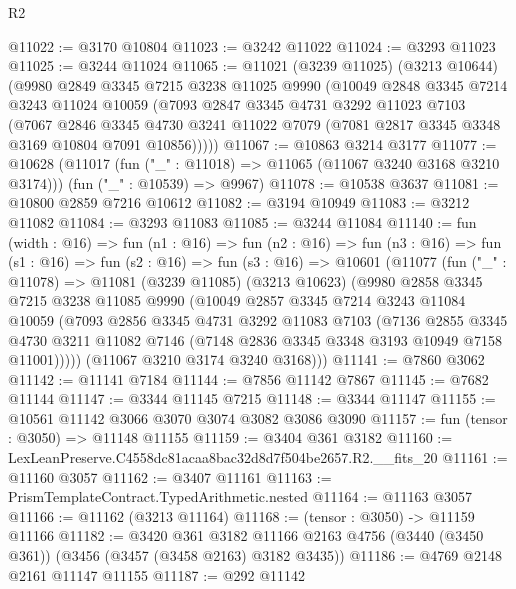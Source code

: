 \begin{lexlean}{R2}
\begin{coremodule}
@11022 := @3170 @10804
@11023 := @3242 @11022
@11024 := @3293 @11023
@11025 := @3244 @11024
@11065 := @11021
    (@3239 @11025)
    (@3213 @10644)
    (@9980
      @2849
      @3345
      @7215
      @3238
      @11025
      @9990
      (@10049
        @2848
        @3345
        @7214
        @3243
        @11024
        @10059
        (@7093
          @2847
          @3345
          @4731
          @3292
          @11023
          @7103
          (@7067
            @2846
            @3345
            @4730
            @3241
            @11022
            @7079
            (@7081 @2817 @3345 @3348 @3169 @10804 @7091 @10856)))))
@11067 := @10863 @3214 @3177
@11077 := @10628
    (@11017 (fun ("_" : @11018) => @11065 (@11067 @3240 @3168 @3210 @3174)))
    (fun ("_" : @10539) => @9967)
@11078 := @10538 @3637
@11081 := @10800 @2859 @7216 @10612
@11082 := @3194 @10949
@11083 := @3212 @11082
@11084 := @3293 @11083
@11085 := @3244 @11084
@11140 := fun (width : @16) =>
  fun (n1 : @16) =>
  fun (n2 : @16) =>
  fun (n3 : @16) =>
  fun (s1 : @16) =>
  fun (s2 : @16) =>
  fun (s3 : @16) =>
  @10601
    (@11077
      (fun ("_" : @11078) =>
      @11081
        (@3239 @11085)
        (@3213 @10623)
        (@9980
          @2858
          @3345
          @7215
          @3238
          @11085
          @9990
          (@10049
            @2857
            @3345
            @7214
            @3243
            @11084
            @10059
            (@7093
              @2856
              @3345
              @4731
              @3292
              @11083
              @7103
              (@7136
                @2855
                @3345
                @4730
                @3211
                @11082
                @7146
                (@7148 @2836 @3345 @3348 @3193 @10949 @7158 @11001)))))
        (@11067 @3210 @3174 @3240 @3168)))
@11141 := @7860 @3062
@11142 := @11141 @7184
@11144 := @7856 @11142 @7867
@11145 := @7682 @11144
@11147 := @3344 @11145 @7215
@11148 := @3344 @11147
@11155 := @10561 @11142 @3066 @3070 @3074 @3082 @3086 @3090
@11157 := fun (tensor : @3050) => @11148 @11155
@11159 := @3404 @361 @3182
@11160 := LexLeanPreserve.C4558dc81acaa8bac32d8d7f504be2657.R2.__fits_20
@11161 := @11160 @3057
@11162 := @3407 @11161
@11163 := PrismTemplateContract.TypedArithmetic.nested
@11164 := @11163 @3057
@11166 := @11162 (@3213 @11164)
@11168 := (tensor : @3050) -> @11159 @11166
@11182 := @3420
    @361
    @3182
    @11166
    @2163
    @4756
    (@3440 (@3450 @361))
    (@3456 (@3457 (@3458 @2163) @3182 @3435))
@11186 := @4769 @2148 @2161 @11147 @11155
@11187 := @292 @11142

\end{coremodule}
\end{lexlean}
